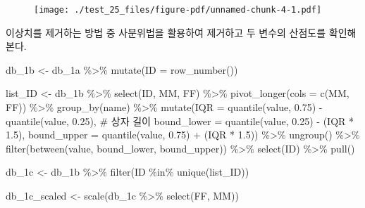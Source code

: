 \documentclass[
  letterpaper,
  DIV=11,
  numbers=noendperiod]{scrreprt}
\newenvironment{Shaded}{\begin{snugshade}}{\end{snugshade}}
\newcommand{\AttributeTok}[1]{\textcolor[rgb]{0.40,0.45,0.13}{#1}}
\newcommand{\CommentTok}[1]{\textcolor[rgb]{0.37,0.37,0.37}{#1}}
\newcommand{\FloatTok}[1]{\textcolor[rgb]{0.68,0.00,0.00}{#1}}
\newcommand{\FunctionTok}[1]{\textcolor[rgb]{0.28,0.35,0.67}{#1}}
\newcommand{\NormalTok}[1]{\textcolor[rgb]{0.00,0.23,0.31}{#1}}
\newcommand{\OtherTok}[1]{\textcolor[rgb]{0.00,0.23,0.31}{#1}}
\newcommand{\SpecialCharTok}[1]{\textcolor[rgb]{0.37,0.37,0.37}{#1}}
\begin{document}
\begin{figure}[H]

{\centering \texttt{[image: ./test\_25\_files/figure-pdf/unnamed-chunk-4-1.pdf]}

}

\end{figure}

이상치를 제거하는 방법 중 사분위법을 활용하여 제거하고 두 변수의
산점도를 확인해본다.

\begin{Shaded}
\begin{Highlighting}[]
\NormalTok{db\_1b }\OtherTok{\textless{}{-}}\NormalTok{ db\_1a }\SpecialCharTok{\%\textgreater{}\%}
  \FunctionTok{mutate}\NormalTok{(}\AttributeTok{ID =} \FunctionTok{row\_number}\NormalTok{()) }

\NormalTok{list\_ID }\OtherTok{\textless{}{-}}\NormalTok{ db\_1b }\SpecialCharTok{\%\textgreater{}\%}
  \FunctionTok{select}\NormalTok{(ID, MM, FF) }\SpecialCharTok{\%\textgreater{}\%}
  \FunctionTok{pivot\_longer}\NormalTok{(}\AttributeTok{cols =} \FunctionTok{c}\NormalTok{(MM, FF)) }\SpecialCharTok{\%\textgreater{}\%} 
  \FunctionTok{group\_by}\NormalTok{(name) }\SpecialCharTok{\%\textgreater{}\%}
  \FunctionTok{mutate}\NormalTok{(}\AttributeTok{IQR =} \FunctionTok{quantile}\NormalTok{(value, }\FloatTok{0.75}\NormalTok{) }\SpecialCharTok{{-}} \FunctionTok{quantile}\NormalTok{(value, }\FloatTok{0.25}\NormalTok{), }\CommentTok{\# 상자 길이}
         \AttributeTok{bound\_lower =} \FunctionTok{quantile}\NormalTok{(value, }\FloatTok{0.25}\NormalTok{) }\SpecialCharTok{{-}}\NormalTok{ (IQR }\SpecialCharTok{*} \FloatTok{1.5}\NormalTok{),}
         \AttributeTok{bound\_upper =} \FunctionTok{quantile}\NormalTok{(value, }\FloatTok{0.75}\NormalTok{) }\SpecialCharTok{+}\NormalTok{ (IQR }\SpecialCharTok{*} \FloatTok{1.5}\NormalTok{)) }\SpecialCharTok{\%\textgreater{}\%}
  \FunctionTok{ungroup}\NormalTok{() }\SpecialCharTok{\%\textgreater{}\%}
  \FunctionTok{filter}\NormalTok{(}\FunctionTok{between}\NormalTok{(value, bound\_lower, bound\_upper)) }\SpecialCharTok{\%\textgreater{}\%}
  \FunctionTok{select}\NormalTok{(ID) }\SpecialCharTok{\%\textgreater{}\%} \FunctionTok{pull}\NormalTok{()}


\NormalTok{db\_1c }\OtherTok{\textless{}{-}}\NormalTok{ db\_1b }\SpecialCharTok{\%\textgreater{}\%}
  \FunctionTok{filter}\NormalTok{(ID }\SpecialCharTok{\%in\%} \FunctionTok{unique}\NormalTok{(list\_ID))}

\NormalTok{db\_1c\_scaled }\OtherTok{\textless{}{-}} \FunctionTok{scale}\NormalTok{(db\_1c }\SpecialCharTok{\%\textgreater{}\%} \FunctionTok{select}\NormalTok{(FF, MM))}
\end{Highlighting}
\end{Shaded}
\end{document}
